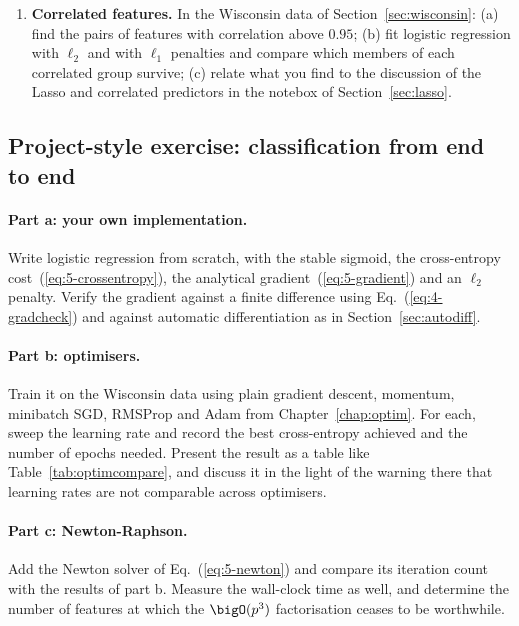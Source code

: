 \begin{enumerate}
\item \textbf{Correlated features.}
  In the Wisconsin data of Section~\ref{sec:wisconsin}:
  (a) find the pairs of features with correlation above $0.95$;
  (b) fit logistic regression with $\ell_2$ and with $\ell_1$ penalties and
      compare which members of each correlated group survive;
  (c) relate what you find to the discussion of the Lasso and correlated
      predictors in the notebox of Section~\ref{sec:lasso}.

\end{enumerate}

\subsection*{Project-style exercise: classification from end to end}

\paragraph{Part a: your own implementation.}
Write logistic regression from scratch, with the stable sigmoid, the
cross-entropy cost~(\ref{eq:5-crossentropy}), the analytical
gradient~(\ref{eq:5-gradient}) and an $\ell_2$ penalty.  Verify the gradient
against a finite difference using Eq.~(\ref{eq:4-gradcheck}) and against
automatic differentiation as in Section~\ref{sec:autodiff}.

\paragraph{Part b: optimisers.}
Train it on the Wisconsin data using plain gradient descent, momentum,
minibatch SGD, RMSProp and Adam from Chapter~\ref{chap:optim}.  For each,
sweep the learning rate and record the best cross-entropy achieved and the
number of epochs needed.  Present the result as a table like
Table~\ref{tab:optimcompare}, and discuss it in the light of the warning there
that learning rates are not comparable across optimisers.

\paragraph{Part c: Newton-Raphson.}
Add the Newton solver of Eq.~(\ref{eq:5-newton}) and compare its iteration
count with the results of part b.  Measure the wall-clock time as well, and
determine the number of features at which the $\bigO(p^{3})$ factorisation
ceases to be worthwhile.

